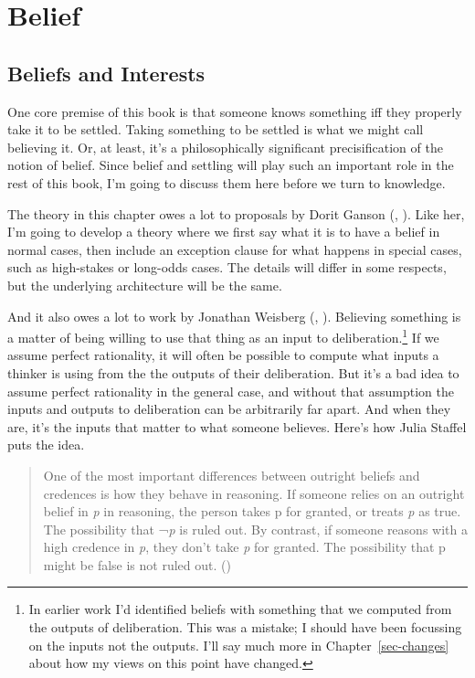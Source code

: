 \documentclass[
  12pt,
  letterpaper,
]{scrbook}
\begin{document}

\chapter{Belief}\label{sec-belief}

\section{Beliefs and Interests}\label{sec-beliefsinterests}

One core premise of this book is that someone knows something iff they
properly take it to be settled. Taking something to be settled is what
we might call believing it. Or, at least, it's a philosophically
significant precisification of the notion of belief. Since belief and
settling will play such an important role in the rest of this book, I'm
going to discuss them here before we turn to knowledge.

The theory in this chapter owes a lot to proposals by Dorit Ganson
(, ). Like
her, I'm going to develop a theory where we first say what it is to have
a belief in normal cases, then include an exception clause for what
happens in special cases, such as high-stakes or long-odds cases. The
details will differ in some respects, but the underlying architecture
will be the same.

And it also owes a lot to work by Jonathan Weisberg
(, ).
Believing something is a matter of being willing to use that thing as an
input to deliberation.\footnote{In earlier work I'd identified beliefs
  with something that we computed from the outputs of deliberation. This
  was a mistake; I should have been focussing on the inputs not the
  outputs. I'll say much more in Chapter~\ref{sec-changes} about how my
  views on this point have changed.} If we assume perfect rationality,
it will often be possible to compute what inputs a thinker is using from
the the outputs of their deliberation. But it's a bad idea to assume
perfect rationality in the general case, and without that assumption the
inputs and outputs to deliberation can be arbitrarily far apart. And
when they are, it's the inputs that matter to what someone believes.
Here's how Julia Staffel puts the idea.

\begin{quote}
One of the most important differences between outright beliefs and
credences is how they behave in reasoning. If someone relies on an
outright belief in \emph{p} in reasoning, the person takes p for
granted, or treats \emph{p} as true. The possibility that ¬\emph{p} is
ruled out. By contrast, if someone reasons with a high credence in
\emph{p}, they don't take \emph{p} for granted. The possibility that p
might be false is not ruled out. ()
\end{quote}
\end{document}
